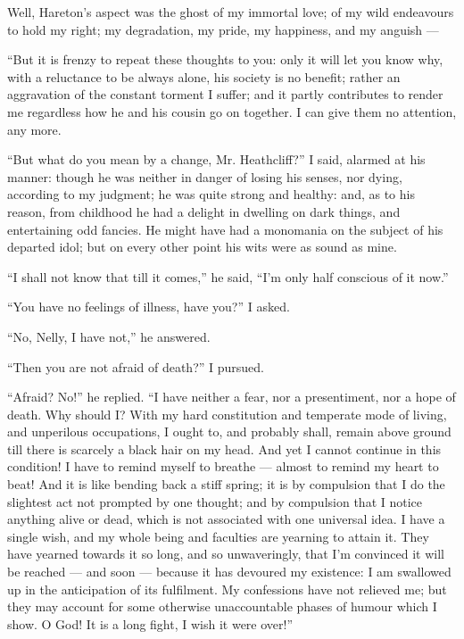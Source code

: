 \par Well, Hareton's aspect was the ghost of my immortal love; of my wild endeavours to hold my right; my degradation, my pride, my happiness, and my anguish —
\par “But it is frenzy to repeat these thoughts to you: only it will let you know why, with a reluctance to be always alone, his society is no benefit; rather an aggravation of the constant torment I suffer; and it partly contributes to render me regardless how he and his cousin go on together. I can give them no attention, any more.
\par “But what do you mean by a change, Mr. Heathcliff?” I said, alarmed at his manner: though he was neither in danger of losing his senses, nor dying, according to my judgment; he was quite strong and healthy: and, as to his reason, from childhood he had a delight in dwelling on dark things, and entertaining odd fancies. He might have had a monomania on the subject of his departed idol; but on every other point his wits were as sound as mine.
\par “I shall not know that till it comes,” he said, “I'm only half conscious of it now.”
\par “You have no feelings of illness, have you?” I asked.
\par “No, Nelly, I have not,” he answered.
\par “Then you are not afraid of death?” I pursued.
\par “Afraid? No!” he replied. “I have neither a fear, nor a presentiment, nor a hope of death. Why should I? With my hard constitution and temperate mode of living, and unperilous occupations, I ought to, and probably shall, remain above ground till there is scarcely a black hair on my head. And yet I cannot continue in this condition! I have to remind myself to breathe — almost to remind my heart to beat! And it is like bending back a stiff spring; it is by compulsion that I do the slightest act not prompted by one thought; and by compulsion that I notice anything alive or dead, which is not associated with one universal idea. I have a single wish, and my whole being and faculties are yearning to attain it. They have yearned towards it so long, and so unwaveringly, that I'm convinced it will be reached — and soon — because it has devoured my existence: I am swallowed up in the anticipation of its fulfilment. My confessions have not relieved me; but they may account for some otherwise unaccountable phases of humour which I show. O God! It is a long fight, I wish it were over!”
